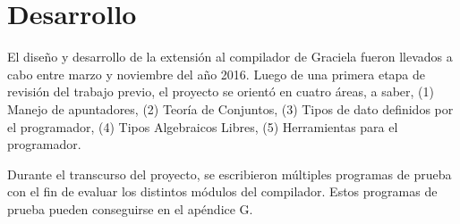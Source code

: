 \chapter{Desarrollo}
\label{capitulo3}


El diseño y desarrollo de la extensión al compilador de Graciela fueron llevados
a cabo entre marzo y noviembre del año 2016. Luego de una primera etapa de
revisión del trabajo previo, el proyecto se orientó en cuatro áreas, a saber,
(1) Manejo de apuntadores, (2) Teoría de Conjuntos, (3) Tipos de dato definidos
por el programador, (4) Tipos Algebraicos Libres, (5) Herramientas para el
programador.

Durante el transcurso del proyecto, se escribieron múltiples programas de prueba
con el fin de evaluar los distintos módulos del compilador. Estos programas de
prueba pueden conseguirse en el apéndice G. %

%
%

